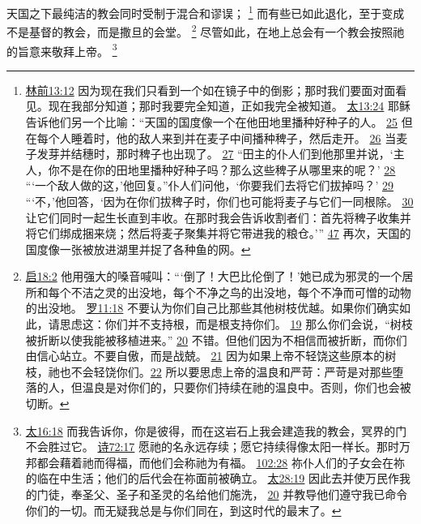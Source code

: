\documentclass[12pt, a4paper, oneside]{ctexart}
\newcounter{parnum}[section]
\newcommand{\N}{%
   \noindent\refstepcounter{parnum}%
    \makebox[\parindent][l]{\textbf{\arabic{parnum}.}}}
\begin{document}
\N 天国之下最纯洁的教会同时受制于混合和谬误；
	\footnote {
		\href{https://biblehub.com/1_corinthians/13-12.htm}{林前13:12} 因为现在我们只看到一个如在镜子中的倒影；那时我们要面对面看见。现在我部分知道；那时我要完全知道，正如我完全被知道。
		\href{https://biblehub.com/matthew/13-24.htm}{太13:24} 耶稣告诉他们另一个比喻：“天国的国度像一个在他田地里播种好种子的人。
        \href{https://biblehub.com/matthew/13-25.htm}{25} 但在每个人睡着时，他的敌人来到并在麦子中间播种稗子，然后走开。
        \href{https://biblehub.com/matthew/13-26.htm}{26} 当麦子发芽并结穗时，那时稗子也出现了。
        \href{https://biblehub.com/matthew/13-27.htm}{27} “田主的仆人们到他那里并说，‘主人，你不是在你的田地里播种好种子吗？那么这些稗子从哪里来的呢？’
        \href{https://biblehub.com/matthew/13-28.htm}{28} “‘一个敌人做的这，’他回复。”仆人们问他，‘你要我们去将它们拔掉吗？’
        \href{https://biblehub.com/matthew/13-29.htm}{29} “‘不，’他回答，‘因为在你们拔稗子时，你们也可能将麦子与它们一同根除。
        \href{https://biblehub.com/matthew/13-30.htm}{30} 让它们同时一起生长直到丰收。在那时我会告诉收割者们：首先将稗子收集并将它们绑成捆来烧；然后将麦子聚集并将它带进我的粮仓。’”
		\href{https://biblehub.com/matthew/13-47.htm}{47} 再次，天国的国度像一张被放进湖里并捉了各种鱼的网。
	}
	而有些已如此退化，至于变成不是基督的教会，而是撒旦的会堂。
	\footnote {
		\href{https://biblehub.com/revelation/18-2.htm}{启18:2} 他用强大的嗓音喊叫：“‘倒了！大巴比伦倒了！’她已成为邪灵的一个居所和每个不洁之灵的出没地，每个不净之鸟的出没地，每个不净而可憎的动物的出没地。
		\href{https://biblehub.com/romans/11-18.htm}{罗11:18} 不要认为你们自己比那些其他树枝优越。如果你们确实如此，请思虑这：你们并不支持根，而是根支持你们。
		\href{https://biblehub.com/romans/11-19.htm}{19} 那么你们会说，“树枝被折断以使我能被移植进来。”
		\href{https://biblehub.com/romans/11-20.htm}{20} 不错。但他们因为不相信而被折断，而你们由信心站立。不要自傲，而是战兢。
		\href{https://biblehub.com/romans/11-21.htm}{21} 因为如果上帝不轻饶这些原本的树枝，祂也不会轻饶你们。\href{https://biblehub.com/romans/11-22.htm}{22} 所以要思虑上帝的温良和严苛：严苛是对那些堕落的人，但温良是对你们的，只要你们持续在祂的温良中。否则，你们也会被切断。
	}
	尽管如此，在地上总会有一个教会按照祂的旨意来敬拜上帝。
	\footnote {
		\href{https://biblehub.com/matthew/16-18.htm}{太16:18} 而我告诉你，你是彼得，而在这岩石上我会建造我的教会，冥界的门不会胜过它。
		\href{https://biblehub.com/psalms/72-17.htm}{诗72:17} 愿祂的名永远存续；愿它持续得像太阳一样长。那时万邦都会藉着祂而得福，而他们会称祂为有福。
		\href{https://biblehub.com/psalms/102-28.htm}{102:28} 祢仆人们的子女会在祢的临在中生活；他们的后代会在祢面前被确立。
		\href{https://biblehub.com/matthew/28-19.htm}{太28:19} 因此去并使万民作我的门徒，奉圣父、圣子和圣灵的名给他们施洗，
		\href{https://biblehub.com/matthew/28-20.htm}{20} 并教导他们遵守我已命令你们的一切。而无疑我总是与你们同在，到这时代的最末了。
	}
\end{document}
